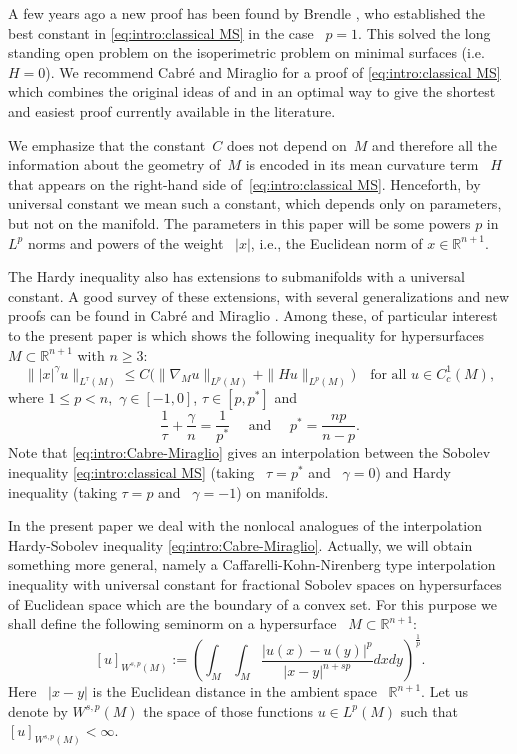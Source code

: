 \documentclass[reqno,12pt]{amsart}
\newcommand{\R}{\mathbb{R}}
\numberwithin{equation}{section}
\theoremstyle{plain}
\theoremstyle{definition}
\renewcommand{\leq}{\leqslant}
\renewcommand{\geq}{\geqslant}
\begin{document}
A few years ago a new proof has been found by Brendle \cite{Brendle}, who established the best constant in \eqref{eq:intro:classical MS} in the case ~$p=1$. This solved the long standing open problem on the isoperimetric problem on minimal surfaces (i.e. ~$H=0$). 
We recommend Cabr\'e and Miraglio  \cite{Cabre-Miraglio2022} for a proof of \eqref{eq:intro:classical MS} which combines the original ideas of \cite{Allard} and \cite{Michael-Simon} in an optimal way to give the shortest and easiest proof  currently available in the literature.

We emphasize that the constant~$C$ does not depend on~$M$ and therefore all the information about the geometry of~$M$ is encoded in its mean curvature term ~$H$ that appears on the right-hand side of~\eqref{eq:intro:classical MS}. Henceforth, by universal constant we mean such a constant, which depends only on parameters, but not on the manifold. The parameters in this paper will be some powers $p$ in ~$L^p$ norms and powers of the weight ~$|x|$, i.e., the Euclidean norm of $x\in\R^{n+1}$.

The Hardy inequality also has extensions to submanifolds with a universal constant. A good survey of these extensions, with several generalizations and new proofs can be found in Cabr\'e and Miraglio \cite{Cabre-Miraglio2022}. Among these, of particular interest to the present paper is \cite[Corollary 1.5 and 4.1]{Cabre-Miraglio2022} which shows the following inequality for hypersurfaces $M\subset\R^{n+1}$ with $n\geq 3$:
\begin{equation}
 \label{eq:intro:Cabre-Miraglio}
   \||x|^{\gamma}u\|_{L^{\tau}(M)} \leq C 
   \Big( \|\nabla_{\! M} u\|_{L^p(M)}+\|Hu\|_{L^p(M)} \Big) \quad
  \text{for all }u\in C_c^1(M),
\end{equation}
where $1\leq p<n,$ $\gamma\in [-1,0]$, $\tau\in [p,p^*]$ and 
$$
  \frac{1}{\tau}+\frac{\gamma}{n}=\frac{1}{p^*}\quad\text{ and }\quad
  p^*=\frac{np}{n-p}.
$$
Note that \eqref{eq:intro:Cabre-Miraglio} gives an interpolation between the Sobolev inequality \eqref{eq:intro:classical MS} (taking ~$\tau=p^*$ and ~$\gamma=0$) and Hardy inequality (taking $\tau=p$ and ~$\gamma=-1$) on manifolds.





In the present paper we deal with the nonlocal analogues of the interpolation Hardy-Sobolev inequality \eqref{eq:intro:Cabre-Miraglio}. Actually, we will obtain something more general, namely a Caffarelli-Kohn-Nirenberg type interpolation inequality with universal constant for fractional Sobolev spaces on hypersurfaces of Euclidean space which are the boundary of a convex set. For this purpose we shall define the following  seminorm on a hypersurface ~$M\subset\R^{n+1}$: 
\begin{equation}\label{eq:intro:seminorm}
  [u]_{W^{s,p}(M)}:=\left(\int_M\int_M \frac{|u(x)-u(y)|^p}{|x-y|^{n+sp}}dxdy\right)^{\frac{1}{p}}.
\end{equation}
Here ~$|x-y|$ is the Euclidean distance in the ambient space ~$\R^{n+1}.$ Let us denote by $W^{s,p}(M)$ the space of those functions $u\in L^p(M)$ such that  $[u]_{W^{s,p}(M)}<\infty.$
\end{document}
